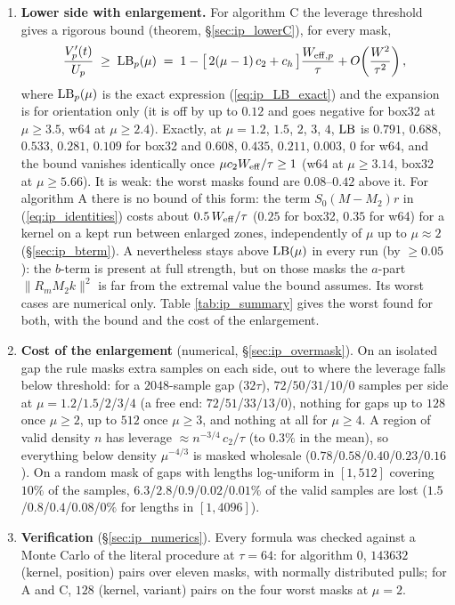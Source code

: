\documentclass{article}
\numberwithin{equation}{section}   %
\begin{document}
\begin{enumerate}
\item {\bf Lower side with enlargement.}  For algorithm C the leverage threshold gives a rigorous bound
(theorem, \S\ref{sec:ip_lowerC}), for every mask,
\begin{equation}
\frac{V'_p(t)}{U_p} \;\ge\; {\rm LB}_p(\mu)
   \;=\; 1 - \big[\, 2(\mu - 1)\, c_2 + c_h \,\big]\frac{W_{{\rm eff},p}}{\tau}
   + O\!\left(\frac{W^2}{\tau^2}\right) ,
\label{eq:ip_LB}
\end{equation}
where ${\rm LB}_p(\mu)$ is the exact expression (\ref{eq:ip_LB_exact}) and the expansion is for
orientation only (it is off by up to $0.12$ and goes negative for box32 at $\mu \ge 3.5$, w64 at
$\mu \ge 2.4$).  Exactly, at $\mu = 1.2$, $1.5$, $2$, $3$, $4$, ${\rm LB}$ is $0.791$, $0.688$,
$0.533$, $0.281$, $0.109$ for box32 and $0.608$, $0.435$, $0.211$, $0.003$, $0$ for w64, and the bound vanishes
identically once $\mu c_2 W_{\rm eff}/\tau \ge 1$ (w64 at $\mu \ge 3.14$, box32 at $\mu \ge 5.66$).  It
is weak: the worst masks found are $0.08$--$0.42$ above it.  For algorithm A there is no bound of this
form: the term $S_0(M - M_2)r$ in (\ref{eq:ip_identities}) costs about $0.5\,W_{\rm eff}/\tau$ ($0.25$
for box32, $0.35$ for w64) for a kernel on a kept run between enlarged zones, independently of $\mu$ up to
$\mu \approx 2$ (\S\ref{sec:ip_bterm}).  A nevertheless stays above ${\rm LB}(\mu)$ in every run (by
$\ge 0.05$): the $b$-term is present at full strength, but on those masks the $a$-part
$\|R_m M_2 k\|^2$ is far from the extremal value the bound assumes.  Its worst cases are numerical only.
Table \ref{tab:ip_summary} gives the worst found for both, with the bound and the cost of the
enlargement.

\item {\bf Cost of the enlargement} (numerical, \S\ref{sec:ip_overmask}).  On an isolated gap the rule
masks extra samples on each side, out to where the leverage falls below threshold: for a $2048$-sample
gap ($32\tau$), $72$/$50$/$31$/$10$/$0$ samples per side at $\mu = 1.2$/$1.5$/$2$/$3$/$4$ (a free end:
$72$/$51$/$33$/$13$/$0$), nothing for gaps up to $128$ once $\mu \ge 2$, up to $512$ once $\mu \ge 3$,
and nothing at all for $\mu \ge 4$.  A region of valid density $n$ has leverage
$\approx n^{-3/4}\,c_2/\tau$ (to $0.3\%$ in the mean), so everything below density $\mu^{-4/3}$ is masked
wholesale ($0.78$/$0.58$/$0.40$/$0.23$/$0.16$).  On a random mask of gaps with lengths log-uniform in
$[1, 512]$ covering $10\%$ of the samples, $6.3$/$2.8$/$0.9$/$0.02$/$0.01\%$ of the valid samples are lost
($1.5$/$0.8$/$0.4$/$0.08$/$0\%$ for lengths in $[1, 4096]$).

\item {\bf Verification} (\S\ref{sec:ip_numerics}).  Every formula was checked against a Monte Carlo of
the literal procedure at $\tau = 64$: for algorithm 0, $143632$ (kernel, position) pairs over eleven
masks, with normally distributed pulls; for A and C, $128$ (kernel, variant) pairs on the four worst
masks at $\mu = 2$.

\end{enumerate}
\end{document}
